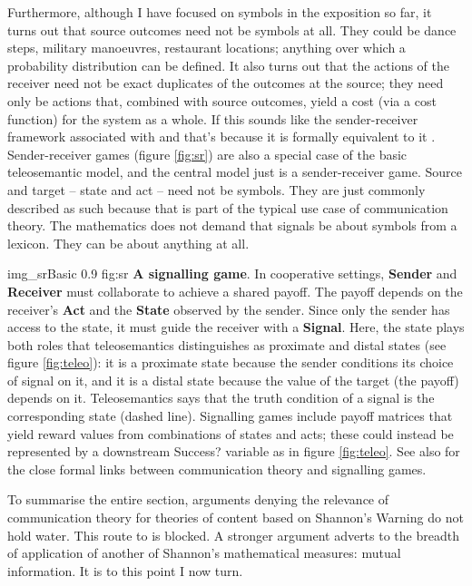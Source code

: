 \documentclass[12pt]{article}
\begin{document}
Furthermore, although I have focused on symbols in the exposition so far, it turns out that source outcomes need not be symbols at all.
They could be dance steps, military manoeuvres, restaurant locations; anything over which a probability distribution can be defined.
It also turns out that the actions of the receiver need not be exact duplicates of the outcomes at the source; they need only be actions that, combined with source outcomes, yield a cost (via a cost function) for the system as a whole.
If this sounds like the sender-receiver framework associated with \citet{skyrms2010signals} and \citet{lewis1969convention} that's because it is formally equivalent to it \citep{martinez2019deception}.
Sender-receiver games (figure \ref{fig:sr}) are also a special case of the basic teleosemantic model, and the central model just is a sender-receiver game.
Source and target -- state and act -- need not be symbols.
They are just commonly described as such because that is part of the typical use case of communication theory.
The mathematics does not demand that signals be about symbols from a lexicon.
They can be about anything at all.

\begin{myfig}
    {img_srBasic} %
    {0.9} %
    {fig:sr} %
    {\textbf{A signalling game}.
    In cooperative settings, \textbf{Sender} and \textbf{Receiver} must collaborate to achieve a shared payoff.
    The payoff depends on the receiver's \textbf{Act} and the \textbf{State} observed by the sender.
    Since only the sender has access to the state, it must guide the receiver with a \textbf{Signal}.
    Here, the state plays both roles that teleosemantics distinguishes as proximate and distal states (see figure \ref{fig:teleo}): it is a proximate state because the sender conditions its choice of signal on it, and it is a distal state because the value of the target (the payoff) depends on it.
    Teleosemantics says that the truth condition of a signal is the corresponding state (dashed line).
    Signalling games include payoff matrices that yield reward values from combinations of states and acts; these could instead be represented by a downstream Success? variable as in figure \ref{fig:teleo}.
    See also \citet{martinez2019deception} for the close formal links between communication theory and signalling games.
    } %
\end{myfig}

To summarise the entire section, arguments denying the relevance of communication theory for theories of content based on {\sc Shannon's Warning} do not hold water.
This route to \tic{} is blocked.
A stronger argument adverts to the breadth of application of another of Shannon's mathematical measures: mutual information.
It is to this point I now turn.
\end{document}
